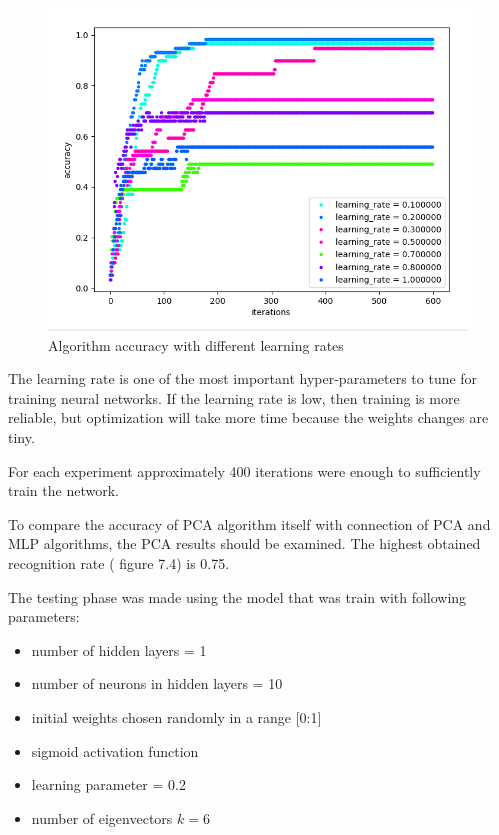 \begin{figure}[H]
\centering
\includegraphics[scale=0.7]{img/tests/20ppl/learning_rates.png}
\caption{Algorithm accuracy with different learning rates}
\end{figure}

The learning rate is one of the most important hyper-parameters to tune for training neural networks. If the learning rate is low, then training is more reliable, but optimization will take more time because the weights changes are tiny.

For each experiment approximately 400 iterations were enough to sufficiently train the network.
 
To compare the accuracy of PCA algorithm itself with connection of PCA and MLP algorithms, the PCA results should be examined. The highest obtained recognition rate ( figure 7.4)  is 0.75.

The testing phase was made using the model that was train with following parameters:

\begin{itemize}
\itemsep0em
\item number of hidden layers = 1
\item number of neurons in hidden layers = 10
\item initial weights chosen randomly in a range [0:1]
\item sigmoid activation function
\item learning parameter = 0.2
\item number of eigenvectors $k = 6$
\end{itemize}


